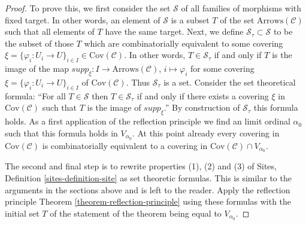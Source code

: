 \begin{proof}
To prove this, we first consider the set $\mathcal{S}$ of all
families of morphisms with fixed target. In other words, an element of
$\mathcal{S}$ is a subset $T$ of the set $\text{Arrows}(\mathcal{C})$
such that all elements of $T$ have the same target. Next, we define
$\mathcal{S}_\tau \subset \mathcal{S}$ to be the subset of those
$T$ which are combinatorially equivalent to some covering
$\xi = \{\varphi_i : U_i \to U\}_{i\in I} \in \text{Cov}(\mathcal{C})$.
In other words, $T \in \mathcal{S}_\tau$ if and only if $T$
is the image of the map $supp_\xi : I \to \text{Arrows}(\mathcal{C})$,
$i\mapsto \varphi_i$ for some covering
$\xi = \{\varphi_i : U_i \to U\}_{i\in I}$
of $\text{Cov}(\mathcal{C})$. Thus $\mathcal{S}_\tau$
is a set. Consider the set theoretical formula: ``For all $T \in \mathcal{S}$
then $T\in \mathcal{S}_\tau$ if and only if there exists
a covering $\xi$ in $\text{Cov}(\mathcal{C})$ such that
$T$ is the image of $supp_\xi$.'' By construction of $\mathcal{S}_\tau$
this formula holds. As a first application of the
reflection principle we find an limit ordinal $\alpha_0$ such that
this formula holds in $V_{\alpha_0}$. At this point already every
covering in $\text{Cov}(\mathcal{C})$ is combinatorially equivalent
to a covering in $\text{Cov}(\mathcal{C}) \cap V_{\alpha_0}$.

\medskip\noindent
The second and final step is to rewrite properties (1), (2) and (3) of
Sites, Definition \ref{sites-definition-site} as set theoretic formulas.
This is similar to the arguments in the sections above and is
left to the reader. Apply the reflection
principle Theorem \ref{theorem-reflection-principle} using these formulas
with the initial set $T$ of the statement of the theorem being equal to
$V_{\alpha_0}$.
\end{proof}








